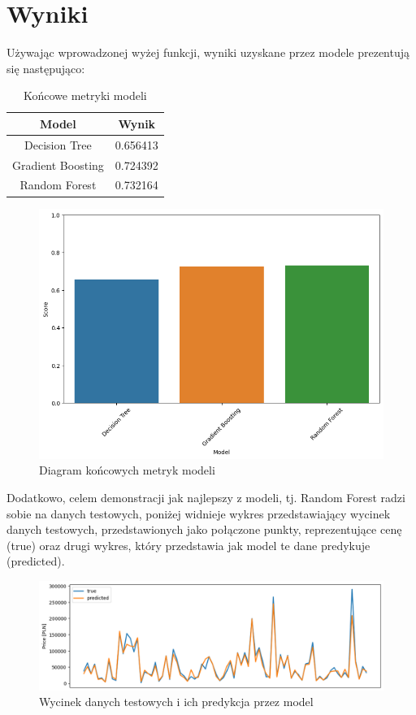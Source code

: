 \documentclass{article}
\begin{document}
\section{Wyniki}
Używając wprowadzonej wyżej funkcji, wyniki uzyskane przez modele prezentują się następująco:

\begin{table}[H]
    \centering
    \begin{tabular}{cc}
        \textbf{Model} & \textbf{Wynik} \\ \hline
        Decision Tree & 0.656413 \\
        Gradient Boosting & 0.724392 \\
        Random Forest & 0.732164
    \end{tabular}
    \caption{Końcowe metryki modeli}
    \label{tab:metrics_end_results}
\end{table}

\begin{figure}[H]
    \centering
    \includegraphics[width=1\linewidth]{images/metryki_modeli.png}
    \caption{Diagram końcowych metryk modeli}
    \label{plt:metrics}
\end{figure}

Dodatkowo, celem demonstracji jak najlepszy z modeli, tj. Random Forest radzi sobie na danych testowych, poniżej widnieje wykres przedstawiający wycinek danych testowych, przedstawionych jako połączone punkty, reprezentujące cenę (true) oraz drugi wykres, który przedstawia jak model te dane predykuje (predicted).

\begin{figure}[H]
    \centering
    \includegraphics[width=1\linewidth]{images/najlepszy_model_predykcja.png}
    \caption{Wycinek danych testowych i ich predykcja przez model}
\end{figure}
\end{document}
